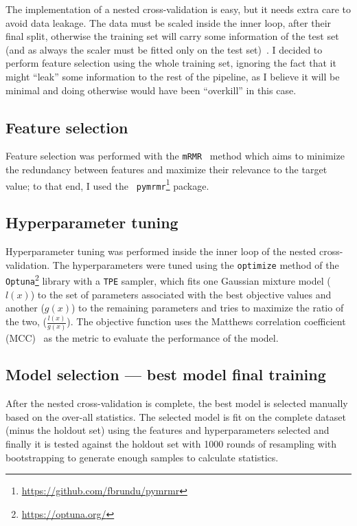 \documentclass[12pt]{article}
\begin{document}
The implementation of a nested cross-validation is easy, but it needs extra
care to avoid data leakage. The data must be scaled inside the inner loop, after
their final split, otherwise the training set will carry some information of the
test set (and as always the scaler must be fitted only on the test
set)~\cite{Bates_2023}. I decided to perform feature selection using the whole
training set, ignoring the fact that it might ``leak'' some information to the
rest of the pipeline, as I believe it will be minimal and doing otherwise would
have been ``overkill'' in this case.


\subsection{Feature selection}

Feature selection was performed with the \texttt{mRMR}~\cite{mRMR}
method which aims to minimize the redundancy between features and maximize their
relevance to the target value; to that end, I used the \texttt{%
pymrmr}\footnote{\url{https://github.com/fbrundu/pymrmr}} package.


\subsection{Hyperparameter tuning}

Hyperparameter tuning was performed inside the inner loop of the nested
cross-validation. The hyperparameters were tuned using the \texttt{optimize}
method of the \texttt{Optuna}\footnote{%
\url{https://optuna.org/}} library with a \texttt{TPE} sampler, which fits
one Gaussian mixture model ($l(x)$) to the set of parameters associated with the
best objective values and another ($g(x)$) to the remaining parameters and tries
to maximize the ratio of the two, ($\frac{l(x)}{g(x)}$). The objective function
uses the Matthews correlation coefficient (MCC)~\cite{Chicco2023} as the metric
to evaluate the performance of the model.


\subsection{Model selection --- best model final training}

After the nested cross-validation is complete, the best model is selected
manually based on the over-all statistics. The selected model is fit on the
complete dataset (minus the holdout set) using the features and hyperparameters
selected and finally it is tested against the holdout set with 1000 rounds of
resampling with bootstrapping to generate enough samples to calculate
statistics.
\end{document}
